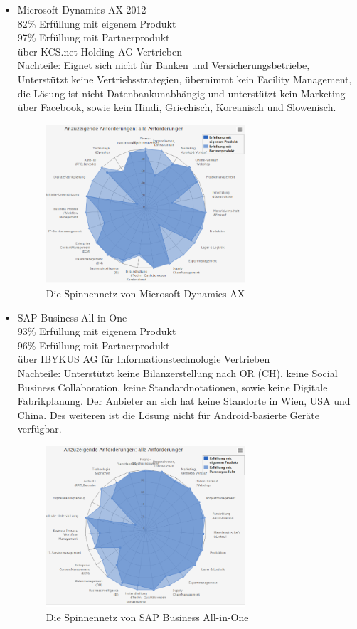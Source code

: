 \documentclass[12pt]{article}
\begin{document}
\begin{itemize}
\item Microsoft Dynamics AX 2012 \\
		82\% Erfüllung mit eigenem Produkt\\
		97\% Erfüllung mit Partnerprodukt\\
		über KCS.net Holding AG Vertrieben\\
		Nachteile: Eignet sich nicht für Banken und Versicherungsbetriebe, Unterstützt keine Vertriebsstrategien, übernimmt kein Facility Management, die Lösung ist nicht Datenbankunabhängig und unterstützt kein Marketing über Facebook, sowie kein Hindi, Griechisch, Koreanisch und Slowenisch.
		
\begin{figure}[here!]
\centering
\includegraphics[width=0.7\textwidth]{images/matching2}
\caption{Die Spinnennetz von  Microsoft Dynamics AX }
\end{figure}\FloatBarrier
\noindent
\item SAP Business All-in-One\\
		93\% Erfüllung mit eigenem Produkt\\
		96\% Erfüllung mit Partnerprodukt\\		
		über IBYKUS AG für Informationstechnologie Vertrieben\\
		Nachteile: Unterstützt keine Bilanzerstellung nach OR (CH), keine Social Business Collaboration, keine Standardnotationen, sowie keine Digitale Fabrikplanung. Der Anbieter an sich hat keine Standorte in Wien, USA und China. Des weiteren ist die Lösung nicht für Android-basierte Geräte verfügbar.
		

\begin{figure}[here!]
\centering
\includegraphics[width=0.7\textwidth]{images/matching3}
\caption{Die Spinnennetz von SAP Business All-in-One}


\end{figure}
\end{itemize}
\end{document}

